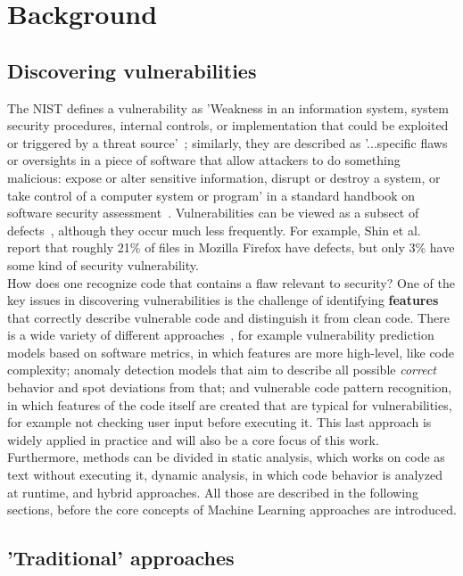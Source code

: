 \documentclass[
a4paper,
pagesize,
pdftex,
12pt,
twoside, %
BCOR=5mm, %
ngerman,
fleqn,
final,
]{scrartcl}
\begin{document}
	\newpage
	\section{Background}\label{Background}
	
	\subsection{Discovering vulnerabilities}
	
	The NIST defines a vulnerability as 'Weakness in an information system, system security procedures, internal controls, or implementation that could be exploited or triggered by a threat source'~\cite{NISTComputerSecurityRessourceCenter.}; similarly, they are described as '...specific flaws or oversights in a piece of software that allow attackers to do something malicious: expose or alter sensitive information, disrupt or destroy a system, or take control of a computer system or program' in a standard handbook on software security assessment~\cite{Dowd.2006}.
	Vulnerabilities can be viewed as a subsect of defects~\cite{Morrison.2015}, although they occur much less frequently. For example, Shin et al.~\cite{Shin.2013} report that roughly 21\% of files in Mozilla Firefox have defects, but only 3\% have some kind of security vulnerability. \\
	How does one recognize code that contains a flaw relevant to security? One of the key issues in discovering vulnerabilities is the challenge of identifying \textbf{features} that correctly describe vulnerable code and distinguish it from clean code. There is a wide variety of different approaches~\cite{Ghaffarian.2017}, for example vulnerability prediction models based on software metrics, in which features are more high-level, like code complexity; anomaly detection models that aim to describe all possible \textit{correct} behavior and spot deviations from that; and vulnerable code pattern recognition, in which features of the code itself are created that are typical for vulnerabilities, for example not checking user input before executing it. This last approach is widely applied in practice and will also be a core focus of this work.\\
	Furthermore, methods can be divided in static analysis, which works on code as text without executing it, dynamic analysis, in which code behavior is analyzed at runtime, and hybrid approaches. All those are described in the following sections, before the core concepts of Machine Learning approaches are introduced.
	\subsection{'Traditional' approaches}
\end{document}
